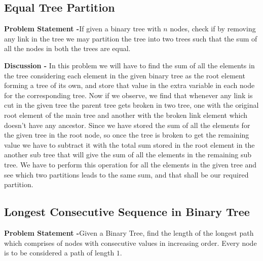 \documentclass[12pt,a4paper,draft]{article}
\begin{document}
\subsection{Equal Tree Partition}
\textbf{Problem Statement -}If given a binary tree with $n$ nodes, check if by removing any link in the tree we may partition the tree into two trees such that the sum of all the nodes in both the trees are equal.
\begin{center}
\end{center}
\textbf{Discussion -} In this problem we will have to find the sum of all the elements in the tree considering each element in the given binary tree as the root element forming a tree of its own, and store that value in the extra variable in each node for the corresponding tree. Now if we observe, we find that whenever any link is cut in the given tree the parent tree gets broken in two tree, one with the original root element of the main tree and another with the broken link element which doesn't have any ancestor. Since we have stored the sum of all the elements for the given tree in the root node, so once the tree is broken to get the remaining value we have to subtract it with the total sum stored in the root element in the another sub tree that will give the sum of all the elements in the remaining sub tree. We have to perform this operation for all the elements in the given tree and see which two partitions leads to the same sum, and that shall be our required partition.
\subsection{Longest Consecutive Sequence in Binary Tree}
\textbf{Problem Statement -}Given a Binary Tree, find the length of the longest path which comprises of nodes with consecutive values in increasing order. Every node is to be considered a path of length $1$.
\\
\begin{center}
\hspace{3cm}
\end{center}
\pagebreak
\end{document}
